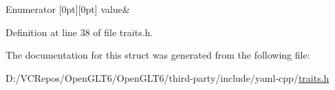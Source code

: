 \begin{DoxyEnumFields}{Enumerator}
[0pt][0pt]{}\mbox{\label{struct_y_a_m_l_1_1is__numeric_3_01unsigned_01long_01int_01_4_a56970b4f0dc45b35c0f8082b86378fc0abd6a2d5f9fb347e2afa3e1a3ba2f89d6}} 
value&\\
\hline

\end{DoxyEnumFields}


Definition at line 38 of file traits.\+h.



The documentation for this struct was generated from the following file\+:\begin{DoxyCompactItemize}
\item 
D\+:/\+V\+C\+Repos/\+Open\+G\+L\+T6/\+Open\+G\+L\+T6/third-\/party/include/yaml-\/cpp/\mbox{\hyperlink{traits_8h}{traits.\+h}}\end{DoxyCompactItemize}
